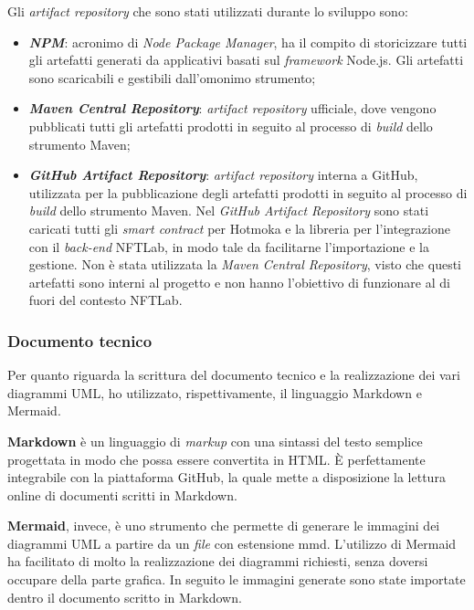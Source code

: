 \noindent Gli \textit{artifact repository} che sono stati utilizzati durante lo sviluppo sono:
\begin{itemize}
  \item \textbf{\textit{NPM}}: acronimo di \textit{Node Package Manager}, ha il compito di storicizzare tutti gli artefatti generati da applicativi basati sul \textit{framework} Node.js. Gli artefatti sono scaricabili e gestibili dall'omonimo strumento;
  \item \textbf{\textit{Maven Central Repository}}: \textit{artifact repository} ufficiale, dove vengono pubblicati tutti gli artefatti prodotti in seguito al processo di \textit{build} dello strumento Maven;
  \item \textbf{\textit{GitHub Artifact Repository}}: \textit{artifact repository} interna a GitHub, utilizzata per la pubblicazione degli artefatti prodotti in seguito al processo di \textit{build} dello strumento Maven. Nel \textit{GitHub Artifact Repository} sono stati caricati tutti gli \textit{smart contract} per Hotmoka e la libreria per l'integrazione con il \textit{back-end} NFTLab, in modo tale da facilitarne l'importazione e la gestione. Non è stata utilizzata la \textit{Maven Central Repository}, visto che questi artefatti sono interni al progetto e non hanno l'obiettivo di funzionare al di fuori del contesto NFTLab.
\end{itemize}

\subsubsection{Documento tecnico}
Per quanto riguarda la scrittura del documento tecnico e la realizzazione dei vari diagrammi UML, ho utilizzato, rispettivamente, il linguaggio Markdown e Mermaid. 

\textbf{Markdown} è un linguaggio di \textit{markup} con una sintassi del testo semplice progettata in modo che possa essere convertita in HTML. È perfettamente integrabile con la piattaforma GitHub, la quale mette a disposizione la lettura online di documenti scritti in Markdown.

\textbf{Mermaid}, invece, è uno strumento che permette di generare le immagini dei diagrammi UML a partire da un \textit{file} con estensione mmd. L'utilizzo di Mermaid ha facilitato di molto la realizzazione dei diagrammi richiesti, senza doversi occupare della parte grafica. In seguito le immagini generate sono state importate dentro il documento scritto in Markdown.

